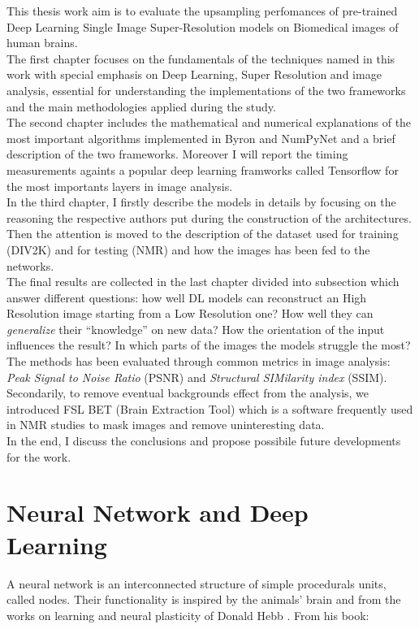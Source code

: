 \documentclass[12pt,a4paper]{report}
\begin{document}
This thesis work aim is to evaluate the upsampling perfomances of pre-trained Deep Learning Single Image Super-Resolution models on Biomedical images of human brains.
\\
The first chapter focuses on the fundamentals of the techniques named in this work with special emphasis on Deep Learning, Super Resolution and image analysis, essential for understanding the implementations of the two frameworks and the main methodologies applied during the study. 
\\
The second chapter includes the mathematical and numerical explanations of the most important algorithms implemented in Byron and NumPyNet and a brief description of the two frameworks. 
Moreover I will report the timing measurements againts a popular deep learning framworks called Tensorflow for the most importants layers in image analysis.
\\
In the third chapter, I firstly describe the models in details by focusing on the reasoning the respective authors put during the construction of the architectures. 
Then the attention is moved to the description of the dataset used for training (DIV2K) and for testing (NMR) and how the images has been fed to the networks. 
\\
The final results are collected in the last chapter divided into subsection which answer different questions: how well DL models can reconstruct an High Resolution image starting from a Low Resolution one? How well they can {\it generalize} their ``knowledge'' on new data?  How the orientation of the input influences the result? In which parts of the images the models struggle the most? 
The methods has been evaluated through common metrics in image analysis: {\it Peak Signal to Noise Ratio} (PSNR) and {\it Structural SIMilarity index} (SSIM). 
Secondarily, to remove eventual backgrounds effect from the analysis, we introduced FSL BET (Brain Extraction Tool) which is a software frequently used in NMR studies to mask images and remove uninteresting data.  
\\
In the end, I discuss the conclusions and propose possibile future developments for the work.

\section{Neural Network and Deep Learning}

  A neural network is an interconnected structure of simple procedurals units, called nodes. Their functionality is inspired by the animals' brain and from the works on learning and neural plasticity of Donald Hebb \cite{hebb-learning}. From his book:
\end{document}
